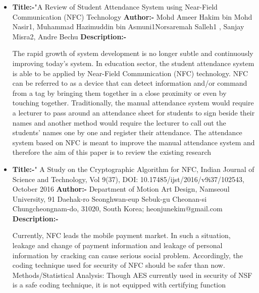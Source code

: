 \documentclass[10pt,a4paper]
{article}
\numberwithin{table}{section}
\begin{document}
{{\begin{normalsize}
\begin{itemize}
\item{\textbf{Title:-}{"A Review of Student Attendance System using Near-Field Communication (NFC) Technology }\newline
\textbf{Author:-}{    Mohd Ameer Hakim bin Mohd Nasir1, Muhammad Hazimuddin bin Asmuni1Norsaremah Salleh1 , Sanjay Misra2, 
    Andre Bechu} \newline
\textbf{Description:-}{The rapid growth of system development is no longer subtle and continuously improving today’s system. In education sector, the student attendance system is able to be applied by Near-Field Communication (NFC) technology. NFC can be referred to as a device that can detect information and/or command from a tag by bringing them together in a close proximity or even by touching together. Traditionally, the manual attendance system would require a lecturer to pass around 
an attendance sheet for students to sign beside their names and another method would require the lecturer to call out the students’ names one by one and register their attendance. The attendance system based on NFC is meant to improve the manual attendance system and therefore the aim of this paper is to review the existing research

}}

\item{\textbf{Title:-}{" A Study on the Cryptographic Algorithm for NFC, Indian Journal of Science and Technology, Vol 9(37), DOI: 10.17485/ijst/2016/v9i37/102543, October 2016}\newline
\textbf{Author:-}{  Department of Motion Art Design, Namseoul University, 91 Daehak-ro Seonghwan-eup Sebuk-gu Cheonan-si Chungcheongnam-do, 31020, South Korea; heonjunekim@gmail.com } \newline
\textbf{Description:-}{Currently, NFC leads the mobile payment market. In such a situation, leakage and change of payment information and leakage of personal information by cracking can cause serious social problem. Accordingly, the coding technique used for security of NFC should be safer than now. Methods/Statistical Analysis: Though AES currently used in security of NSF is a safe coding technique, it is not equipped with certifying function

}}


\end{itemize}
\end{normalsize}}}
\end{document}
